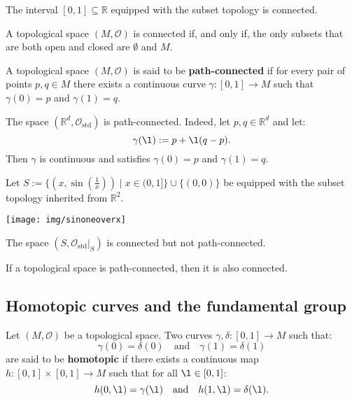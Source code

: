 \documentclass[root.tex]{subfiles}
\begin{document}
\begin{theorem}
The interval $[0,1]\subseteq\mathbb{R}$ equipped with the subset topology is connected.
\end{theorem}

\begin{theorem}
A topological space $(M,\mathcal{O})$ is connected if, and only if, the only subsets that are both open and closed are $\emptyset$ and $M$.
\end{theorem}

\begin{mydef}
  A topological space $(M,\mathcal{O})$ is said to be \textbf{path-connected} if for every pair of points $p,q\in M$ there exists a continuous curve $\gamma:[0,1]\to M$ such that $\gamma(0)=p$ and $\gamma(1)=q$.
\end{mydef}

\begin{myex}
The space $(\mathbb{R}^d,\mathcal{O}_\mathrm{std})$ is path-connected. Indeed, let $p,q\in\mathbb{R}^d$ and let:
$$
\gamma(\l):=p+\l(q-p).
$$
Then $\gamma$ is continuous and satisfies $\gamma(0)=p$ and $\gamma(1)=q$.
\end{myex}

\begin{myex}
Let $S:=\{(x,\sin(\tfrac{1}{x}))\mid x\in (0,1]\}\cup \{(0,0)\}$ be equipped with the subset topology inherited from $\mathbb{R}^2$.
\begin{center}
\texttt{[image: img/sinoneoverx]}
\end{center}
The space $(S,\mathcal{O}_\mathrm{std}|_S)$ is connected but not path-connected.
\end{myex}

\begin{theorem}
If a topological space is path-connected, then it is also connected.
\end{theorem}

\subsection{Homotopic curves and the fundamental group}

\begin{mydef}
Let $(M,\mathcal{O})$ be a topological space. Two curves $\gamma,\delta:[0,1]\to M$ such that:
$$
\gamma(0)=\delta(0) \quad \text{and} \quad \gamma(1)=\delta(1)
$$
are said to be \textbf{homotopic} if there exists a continuous map $h : [0,1]\times[0,1]\to M$ such that for all $\l \in [0,1]$:
$$
h(0,\l) = \gamma(\l) \quad \text{and} \quad h(1,\l)=\delta(\l).
$$
\end{mydef}
\end{document}
